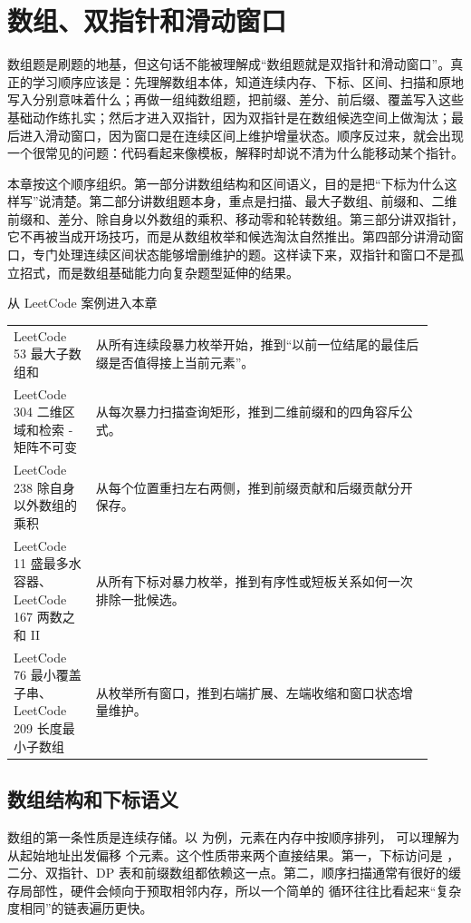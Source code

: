 \chapter{数组、双指针和滑动窗口}

数组题是刷题的地基，但这句话不能被理解成“数组题就是双指针和滑动窗口”。真正的学习顺序应该是：先理解数组本体，知道连续内存、下标、区间、扫描和原地写入分别意味着什么；再做一组纯数组题，把前缀、差分、前后缀、覆盖写入这些基础动作练扎实；然后才进入双指针，因为双指针是在数组候选空间上做淘汰；最后进入滑动窗口，因为窗口是在连续区间上维护增量状态。顺序反过来，就会出现一个很常见的问题：代码看起来像模板，解释时却说不清为什么能移动某个指针。

本章按这个顺序组织。第一部分讲数组结构和区间语义，目的是把“下标为什么这样写”说清楚。第二部分讲数组题本身，重点是扫描、最大子数组、前缀和、二维前缀和、差分、除自身以外数组的乘积、移动零和轮转数组。第三部分讲双指针，它不再被当成开场技巧，而是从数组枚举和候选淘汰自然推出。第四部分讲滑动窗口，专门处理连续区间状态能够增删维护的题。这样读下来，双指针和窗口不是孤立招式，而是数组基础能力向复杂题型延伸的结果。

\begin{principlebox}{从 LeetCode 案例进入本章}
\begin{tabular}{@{}p{0.18\linewidth}p{0.74\linewidth}@{}}
LeetCode 53 最大子数组和 & 从所有连续段暴力枚举开始，推到“以前一位结尾的最佳后缀是否值得接上当前元素”。\\
LeetCode 304 二维区域和检索 - 矩阵不可变 & 从每次暴力扫描查询矩形，推到二维前缀和的四角容斥公式。\\
LeetCode 238 除自身以外数组的乘积 & 从每个位置重扫左右两侧，推到前缀贡献和后缀贡献分开保存。\\
LeetCode 11 盛最多水容器、LeetCode 167 两数之和 II & 从所有下标对暴力枚举，推到有序性或短板关系如何一次排除一批候选。\\
LeetCode 76 最小覆盖子串、LeetCode 209 长度最小子数组 & 从枚举所有窗口，推到右端扩展、左端收缩和窗口状态增量维护。\\
\end{tabular}
\end{principlebox}

\section{数组结构和下标语义}

数组的第一条性质是连续存储。以  为例，元素在内存中按顺序排列， 可以理解为从起始地址出发偏移  个元素。这个性质带来两个直接结果。第一，下标访问是 ，二分、双指针、DP 表和前缀数组都依赖这一点。第二，顺序扫描通常有很好的缓存局部性，硬件会倾向于预取相邻内存，所以一个简单的  循环往往比看起来“复杂度相同”的链表遍历更快。


